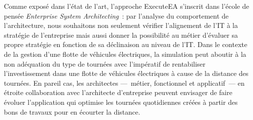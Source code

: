 Comme exposé dans l'état de l'art, l'approche ExecuteEA s'inscrit dans l'école
de pensée \emph{Enterprise System Architecting}~: par l'analyse du comportement
de l'architecture, nous souhaitons non seulement vérifier l'alignement de l'IT à
la stratégie de l'entreprise mais aussi donner la possibilité au métier
d'évaluer sa propre stratégie en fonction de sa déclinaison au niveau de l'IT.
Dans le contexte de la gestion d'une flotte de véhicules électriques, la
simulation peut aboutir à la non adéquation du type de tournées avec l'impératif
de rentabiliser l'investissement dans une flotte de véhicules électriques à
cause de la distance des tournées. En pareil cas, les architectes —~métier,
fonctionnel et applicatif~— en étroite collaboration avec l'architecte
d'entreprise peuvent envisager de faire évoluer l'application qui optimise les tournées quotidiennes 
créées à partir des bons de travaux pour en écourter la distance.




 
%






